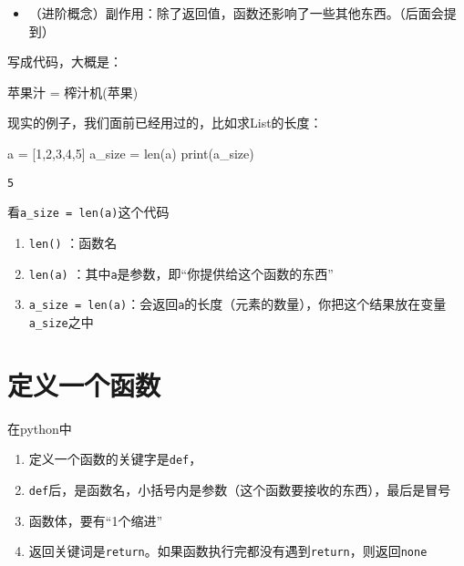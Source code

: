 \documentclass[
  letterpaper,
  DIV=11,
  numbers=noendperiod]{scrreprt}
\newenvironment{Shaded}{\begin{snugshade}}{\end{snugshade}}
\newcommand{\BuiltInTok}[1]{\textcolor[rgb]{0.00,0.23,0.31}{#1}}
\newcommand{\DecValTok}[1]{\textcolor[rgb]{0.68,0.00,0.00}{#1}}
\newcommand{\NormalTok}[1]{\textcolor[rgb]{0.00,0.23,0.31}{#1}}
\newcommand{\OperatorTok}[1]{\textcolor[rgb]{0.37,0.37,0.37}{#1}}
\providecommand{\tightlist}{%
  \setlength{\itemsep}{0pt}\setlength{\parskip}{0pt}}\usepackage{longtable,booktabs,array}
\begin{document}
\begin{itemize}
\tightlist
\item
  （进阶概念）副作用：除了返回值，函数还影响了一些其他东西。（后面会提到）
\end{itemize}

写成代码，大概是：

\begin{Shaded}
\begin{Highlighting}[]
\NormalTok{苹果汁 }\OperatorTok{=}\NormalTok{ 榨汁机(苹果)}
\end{Highlighting}
\end{Shaded}

现实的例子，我们面前已经用过的，比如求List的长度：

\begin{Shaded}
\begin{Highlighting}[]
\NormalTok{a }\OperatorTok{=}\NormalTok{ [}\DecValTok{1}\NormalTok{,}\DecValTok{2}\NormalTok{,}\DecValTok{3}\NormalTok{,}\DecValTok{4}\NormalTok{,}\DecValTok{5}\NormalTok{]}
\NormalTok{a\_size }\OperatorTok{=} \BuiltInTok{len}\NormalTok{(a)}
\BuiltInTok{print}\NormalTok{(a\_size)}
\end{Highlighting}
\end{Shaded}

\begin{verbatim}
5
\end{verbatim}

看\texttt{a\_size\ =\ len(a)}这个代码

\begin{enumerate}
\def\labelenumi{\arabic{enumi}.}
\tightlist
\item
  \texttt{len()} ：函数名
\item
  \texttt{len(a)} ：其中\texttt{a}是参数，即``你提供给这个函数的东西''
\item
  \texttt{a\_size\ =\ len(a)}：会返回\texttt{a}的长度（元素的数量），你把这个结果放在变量\texttt{a\_size}之中
\end{enumerate}

\hypertarget{ux5b9aux4e49ux4e00ux4e2aux51fdux6570}{%
\section{定义一个函数}\label{ux5b9aux4e49ux4e00ux4e2aux51fdux6570}}

在python中

\begin{enumerate}
\def\labelenumi{\arabic{enumi}.}
\tightlist
\item
  定义一个函数的关键字是\texttt{def}，
\item
  \texttt{def}后，是函数名，小括号内是参数（这个函数要接收的东西），最后是冒号
\item
  函数体，要有``1个缩进''
\item
  返回关键词是\texttt{return}。如果函数执行完都没有遇到\texttt{return}，则返回\texttt{none}
\end{enumerate}
\end{document}
